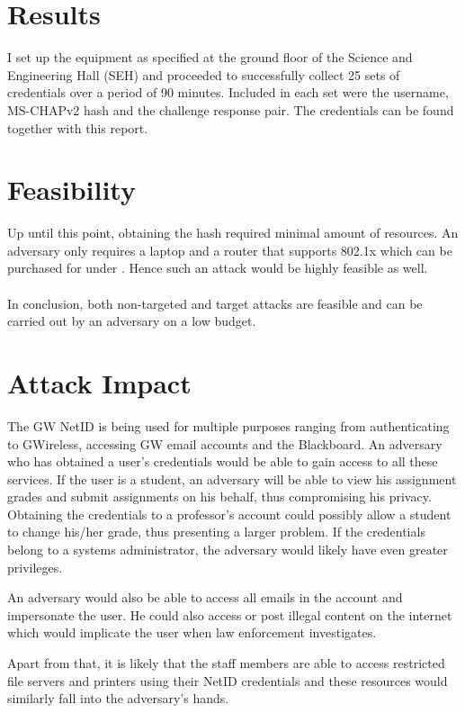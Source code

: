 \documentclass[twoside]{article}
\begin{document}
\begin{multicols}{2}
\section{Results}

I set up the equipment as specified at the ground floor of the Science and Engineering Hall (SEH) and proceeded to successfully collect 25 sets of credentials over a period of 90 minutes. Included in each set were the username, MS-CHAPv2 hash and the challenge response pair. The credentials can be found together with this report.



\section{Feasibility}

Up until this point, obtaining the hash required minimal amount of resources. An adversary only requires a laptop and a router that supports 802.1x which can be purchased for under . Hence such an attack would be highly feasible as well.
~\\
\\In conclusion, both non-targeted and target attacks are feasible and can be carried out by an adversary on a low budget.




\section{Attack Impact}

The GW NetID is being used for multiple purposes ranging from authenticating to GWireless, accessing GW email accounts and the Blackboard. An adversary who has obtained a user's credentials would be able to gain access to all these services. If the user is a student, an adversary will be able to view his assignment grades and submit assignments on his behalf, thus compromising his privacy. Obtaining the credentials to a professor's account could possibly allow a student to change his/her grade, thus presenting a larger problem. If the credentials belong to a systems administrator, the adversary would likely have even greater privileges.

An adversary would also be able to access all emails in the account and impersonate the user. He could also access or post illegal content on the internet which would implicate the user when law enforcement investigates.

Apart from that, it is likely that the staff members are able to access restricted file servers and printers using their NetID credentials and these resources would similarly fall into the adversary's hands.


\end{multicols}
\end{document}

